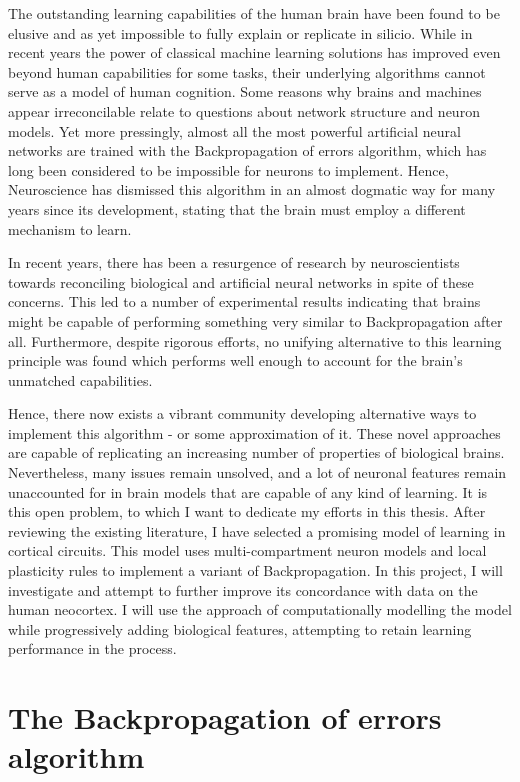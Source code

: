 The outstanding learning capabilities of the human brain have been found to be elusive and as yet impossible to fully
explain or replicate in silicio. While in recent years the power of classical machine learning solutions  has improved
even beyond human capabilities for some tasks, their underlying algorithms cannot serve as a model of human cognition.
Some reasons why brains and machines appear irreconcilable relate to questions about network structure and neuron
models. Yet more pressingly, almost all the most powerful artificial neural networks are trained with the
Backpropagation of errors algorithm, which has long been considered to be impossible for neurons to implement. Hence,
Neuroscience has dismissed this algorithm in an almost dogmatic way for many years since its development, stating that
the brain must employ a different mechanism to learn.

In recent years, there has been a resurgence of research by neuroscientists towards reconciling biological and
artificial neural networks in spite of these concerns. This led to a number of experimental results indicating that
brains might be capable of performing something very similar to Backpropagation after all. Furthermore, despite rigorous
efforts, no unifying alternative to this learning principle was found which performs well enough to account for the
brain's unmatched capabilities.

Hence, there now exists a vibrant community developing alternative ways to implement this algorithm - or some
approximation of it. These novel approaches are capable of replicating an increasing number of properties of biological
brains. Nevertheless, many issues remain unsolved, and a lot of neuronal features remain unaccounted for in brain models
that are capable of any kind of learning. It is this open problem, to which I want to dedicate my efforts in this
thesis. After reviewing the existing literature, I have selected a promising model of learning in cortical circuits.
This model uses multi-compartment neuron models and local plasticity rules to implement a variant of Backpropagation. In
this project, I will investigate and attempt to further improve its concordance with data on the human neocortex. I will
use the approach of computationally modelling the model while progressively adding biological features, attempting to
retain learning performance in the process.


\section{The Backpropagation of errors algorithm}


